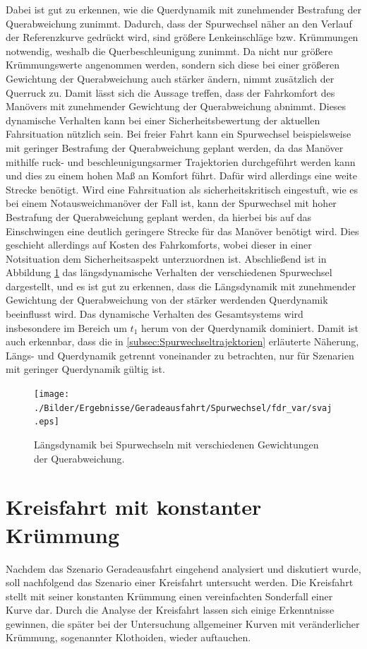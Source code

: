 Dabei ist gut zu erkennen, wie die Querdynamik mit zunehmender Bestrafung der Querabweichung zunimmt. Dadurch, dass der Spurwechsel näher an den Verlauf der Referenzkurve gedrückt wird, sind größere Lenkeinschläge bzw. Krümmungen notwendig, weshalb die Querbeschleunigung zunimmt. Da nicht nur größere Krümmungswerte angenommen werden, sondern sich diese bei einer größeren Gewichtung der Querabweichung auch stärker ändern, nimmt zusätzlich der Querruck zu. Damit lässt sich die Aussage treffen, dass der Fahrkomfort des Manövers mit zunehmender Gewichtung der Querabweichung abnimmt. Dieses dynamische Verhalten kann bei einer Sicherheitsbewertung der aktuellen Fahrsituation nützlich sein. Bei freier Fahrt kann ein Spurwechsel beispielsweise mit geringer Bestrafung der Querabweichung geplant werden, da das Manöver mithilfe ruck- und beschleunigungsarmer Trajektorien durchgeführt werden kann und dies zu einem hohen Maß an Komfort führt. Dafür wird allerdings eine weite Strecke benötigt. Wird eine Fahrsituation als sicherheitskritisch eingestuft, wie es bei einem Notausweichmanöver der Fall ist, kann der Spurwechsel mit hoher Bestrafung der Querabweichung geplant werden, da hierbei bis auf das Einschwingen eine deutlich geringere Strecke für das Manöver benötigt wird. Dies geschieht allerdings auf Kosten des Fahrkomforts, wobei dieser in einer Notsituation dem Sicherheitsaspekt unterzuordnen ist. Abschließend ist in Abbildung \ref{fig:svaj_fdr_var} das längsdynamische Verhalten der verschiedenen Spurwechsel dargestellt, und es ist gut zu erkennen, dass die Längsdynamik mit zunehmender Gewichtung der Querabweichung von der stärker werdenden Querdynamik beeinflusst wird. Das dynamische Verhalten des Gesamtsystems wird insbesondere im Bereich um $t_1$ herum von der Querdynamik dominiert. Damit ist auch erkennbar, dass die in \ref{subsec:Spurwechseltrajektorien} erläuterte Näherung, Längs- und Querdynamik getrennt voneinander zu betrachten, nur für Szenarien mit geringer Querdynamik gültig ist.
\begin{figure}[h] 
	\centering
	\texttt{[image: ./Bilder/Ergebnisse/Geradeausfahrt/Spurwechsel/fdr\_var/svaj.eps]}
	\caption{Längsdynamik bei Spurwechseln mit verschiedenen Gewichtungen der Querabweichung.}
	\label{fig:svaj_fdr_var}
\end{figure} 

\newpage
\section{Kreisfahrt mit konstanter Krümmung}\label{sec:Kreisfahrt}
Nachdem das Szenario Geradeausfahrt eingehend analysiert und diskutiert wurde, soll nachfolgend das Szenario einer Kreisfahrt untersucht werden. Die Kreisfahrt stellt mit seiner konstanten Krümmung einen vereinfachten Sonderfall einer Kurve dar. Durch die Analyse der Kreisfahrt lassen sich einige Erkenntnisse gewinnen, die später bei der Untersuchung allgemeiner Kurven mit veränderlicher Krümmung, sogenannter Klothoiden, wieder auftauchen.

